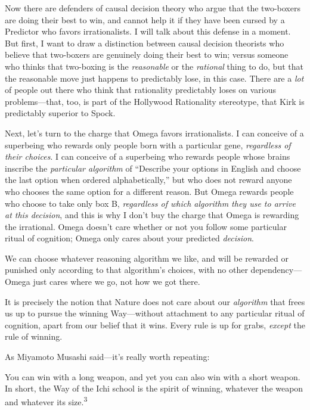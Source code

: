 {
 Now there are defenders of causal decision theory who argue that
the two-boxers are doing their best to win, and cannot help it if they
have been cursed by a Predictor who favors irrationalists. I will talk
about this defense in a moment. But first, I want to draw a distinction
between causal decision theorists who believe that two-boxers are
genuinely doing their best to win; versus someone who thinks that
two-boxing is the \textit{reasonable} or the \textit{rational} thing to
do, but that the reasonable move just happens to predictably lose, in
this case. There are a \textit{lot} of people out there who think that
rationality predictably loses on various problems---that, too, is part
of the Hollywood Rationality stereotype, that Kirk is predictably
superior to Spock.}

{
 Next, let's turn to the charge that Omega favors
irrationalists. I can conceive of a superbeing who rewards only people
born with a particular gene, \textit{regardless of their choices}. I
can conceive of a superbeing who rewards people whose brains inscribe
the \textit{particular algorithm} of ``Describe your
options in English and choose the last option when ordered
alphabetically,'' but who does not reward anyone who
chooses the same option for a different reason. But Omega rewards
people who choose to take only box B, \textit{regardless of which
algorithm they use to arrive at this decision}, and this is why I
don't buy the charge that Omega is rewarding the
irrational. Omega doesn't care whether or not you
follow some particular ritual of cognition; Omega only cares about your
predicted \textit{decision}.}

{
 We can choose whatever reasoning algorithm we like, and will be
rewarded or punished only according to that algorithm's
choices, with no other dependency---Omega just cares where we go, not
how we got there.}

{
 It is precisely the notion that Nature does not care about our
\textit{algorithm} that frees us up to pursue the winning Way---without
attachment to any particular ritual of cognition, apart from our belief
that it wins. Every rule is up for grabs, \textit{except} the rule of
winning.}

{
 As Miyamoto Musashi said---it's really worth
repeating:}

{
 You can win with a long weapon, and yet you can also win with a
short weapon. In short, the Way of the Ichi school is the spirit of
winning, whatever the weapon and whatever its size.\textsuperscript{3}}

